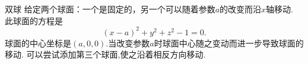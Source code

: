 ﻿\begin{surferPage}{双球}
给定两个球面：一个是固定的，另一个可以随着参数$a$的改变而沿$x$轴移动.
此球面的方程是
\[(x-a)^2+y^2+z^2-1=0.\]
球面的中心坐标是$(a,0,0)$.当改变参数$a$时球面中心随之变动而进一步导致球面的移动.
可以尝试添加第三个球面,使之沿着相反方向移动.
\end{surferPage}
